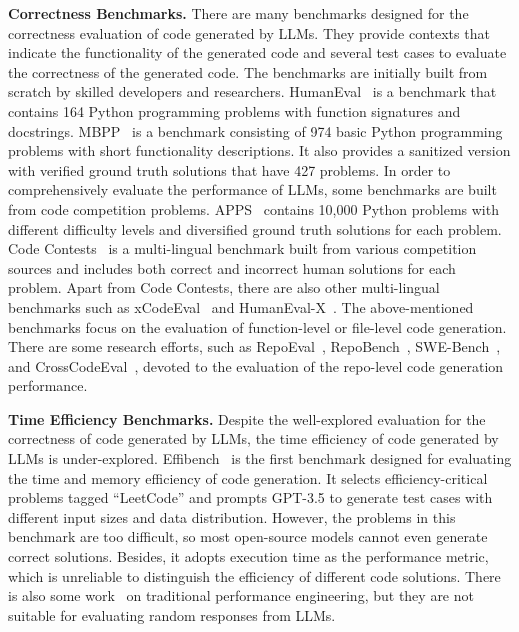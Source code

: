 \textbf{Correctness Benchmarks.} There are many benchmarks designed for the correctness evaluation of code generated by LLMs. They provide contexts that indicate the functionality of the generated code and several test cases to evaluate the correctness of the generated code. The benchmarks are initially built from scratch by skilled developers and researchers. HumanEval~\cite{humaneval} is a benchmark that contains 164 Python programming problems with function signatures and docstrings. MBPP~\cite{mbpp} is a benchmark consisting of 974 basic Python programming problems with short functionality descriptions. It also provides a sanitized version with verified ground truth solutions that have 427 problems. In order to comprehensively evaluate the performance of LLMs, some benchmarks are built from code competition problems. APPS~\cite{apps} contains 10,000 Python problems with different difficulty levels and diversified ground truth solutions for each problem. Code Contests~\cite{codecontests} is a multi-lingual benchmark built from various competition sources and includes both correct and incorrect human solutions for each problem. Apart from Code Contests, there are also other multi-lingual benchmarks such as xCodeEval~\cite{xcodeeval} and HumanEval-X~\cite{humanevalx}. The above-mentioned benchmarks focus on the evaluation of function-level or file-level code generation. There are some research efforts, such as RepoEval~\cite{repoeval}, RepoBench~\cite{repobench}, SWE-Bench~\cite{swebench}, and CrossCodeEval~\cite{crosscodeeval}, devoted to the evaluation of the repo-level code generation performance. 

\textbf{Time Efficiency Benchmarks.} Despite the well-explored evaluation for the correctness of code generated by LLMs, the time efficiency of code generated by LLMs is under-explored.  Effibench~\cite{effibench} is the first benchmark designed for evaluating the time and memory efficiency of code generation.  It selects efficiency-critical problems tagged ``LeetCode'' and prompts GPT-3.5 to generate test cases with different input sizes and data distribution. However, the problems in this benchmark are too difficult, so most open-source models cannot even generate correct solutions. Besides, it adopts execution time as the performance metric, which is unreliable to distinguish the efficiency of different code solutions. There is also some work~\cite{zapa09accuracy,laaber20dynamic,traini23towards} on traditional performance engineering, but they are not suitable for evaluating random responses from LLMs.

